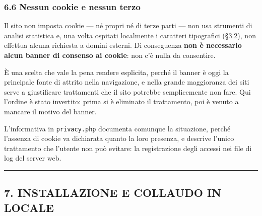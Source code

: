 \documentclass[
  11pt,
]{article}
\begin{document}
\hypertarget{nessun-cookie-e-nessun-terzo}{%
\subsubsection{6.6 Nessun cookie e nessun
terzo}\label{nessun-cookie-e-nessun-terzo}}

Il sito non imposta cookie --- né propri né di terze parti --- non usa
strumenti di analisi statistica e, una volta ospitati localmente i
caratteri tipografici (§3.2), non effettua alcuna richiesta a domini
esterni. Di conseguenza \textbf{non è necessario alcun banner di
consenso ai cookie}: non c'è nulla da consentire.

È una scelta che vale la pena rendere esplicita, perché il banner è oggi
la principale fonte di attrito nella navigazione, e nella grande
maggioranza dei siti serve a giustificare trattamenti che il sito
potrebbe semplicemente non fare. Qui l'ordine è stato invertito: prima
si è eliminato il trattamento, poi è venuto a mancare il motivo del
banner.

L'informativa in \texttt{privacy.php} documenta comunque la situazione,
perché l'assenza di cookie va dichiarata quanto la loro presenza, e
descrive l'unico trattamento che l'utente non può evitare: la
registrazione degli accessi nei file di log del server web.

\begin{center}\rule{0.5\linewidth}{0.5pt}\end{center}

\hypertarget{installazione-e-collaudo-in-locale}{%
\subsection{7. INSTALLAZIONE E COLLAUDO IN
LOCALE}\label{installazione-e-collaudo-in-locale}}
\end{document}
